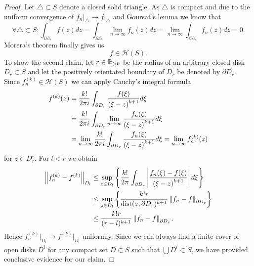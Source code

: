 \begin{proof}
	Let $\triangle \subset S$ denote a closed solid triangle. As $\triangle$ is compact and due to the uniform convergence of $f_n\big\vert _\triangle \to f\big\vert _\triangle$ and Goursat’s lemma we know that
\begin{equation*}
	\forall \triangle \subset S \colon \int_{\partial \triangle} f(z) dz = \int_{\partial \triangle} \lim\limits_{n \to \infty} f_n(z) dz	= \lim\limits_{n \to \infty}\int_{\partial \triangle} f_n(z) dz = 0.
\end{equation*}
	 Morera's theorem finally gives us
\begin{equation*}
	f \in \mathcal{H}(S).
\end{equation*}
	To show the second claim, let $r \in \mathbb{R}_{> 0}$ be the radius of an arbitrary closed disk $D_r \subset S$ and let the positively orientated boundary of $D_r$ be denoted by $\partial D_r$. Since $f_n^{(k)} \in \mathcal{H}(S)$ we can apply Cauchy's integral formula
\begin{equation*}
\begin{aligned}
	f^{(k)}(z)
	&= \frac{k!}{2 \pi i} \int _{\partial D_r} \frac{f(\xi)}{\left(\xi - z\right)^{k + 1}} d\xi \\
	&= \frac{k!}{2 \pi i} \int _{\partial D_r} \lim\limits_{n \to \infty} \frac{f_n(\xi)}{\left(\xi - z\right)^{k + 1}} d\xi \\
	&= \lim\limits_{n \to \infty} \frac{k!}{2 \pi i} \int _{\partial D_r} \frac{f_n(\xi)}{\left(\xi - z\right)^{k + 1}} d\xi
	= \lim\limits_{n \to \infty} f_n^{(k)}(z)
\end{aligned}
\end{equation*}
	for $z \in D_r^\circ$. For $l < r$ we obtain
\begin{equation*}
\begin{aligned}
	\left\lVert f_n^{(k)} - f^{(k)}\right\rVert_{D_l}
	&\leq \sup\limits_{z \in D_l} \left\{\frac{k!}{2 \pi} \int _{\partial D_r}\left|\frac{f_n(\xi) - f(\xi)}{\left(\xi - z\right)^{k + 1}}\right| d\xi\right\} \\
	&\leq \sup\limits_{z \in D_l} \left\{\frac{k! r}{\operatorname{\text{dist}}(z, \partial D_r)^{k + 1}} \left\lVert f_n - f\right\rVert_{\partial D_r}\right\} \\
	&\leq \frac{k! r}{(r - l)^{k + 1}} \left\lVert f_n - f\right\rVert_{\partial D_r}.
\end{aligned}
\end{equation*}
	Hence $f_n^{(k)}\big\vert _{D_l} \to f^{(k)}\big\vert _{D_l}$ uniformly. Since we can always find a finite cover of open disks $D^i$ for any compact set $D \subset S$ such that $\bigcup \overline{D^i} \subset S$, we have provided conclusive evidence for our claim.
\end{proof}


